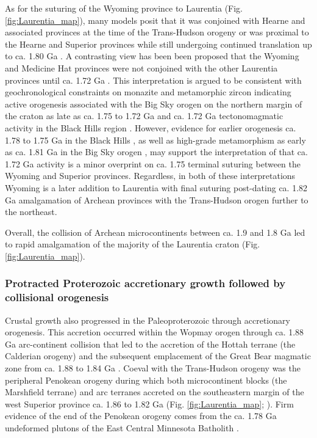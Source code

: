 \documentclass[twocolumn, switch]{article} %
\begin{document}
As for the suturing of the Wyoming province to Laurentia (Fig. \ref{fig:Laurentia_map}), many models posit that it was conjoined with Hearne and associated provinces at the time of the Trans-Hudson orogeny \citep[e.g.][]{St-Onge2009a, Pehrsson2015a} or was proximal to the Hearne and Superior provinces while still undergoing continued translation up to ca. 1.80 Ga \citep{Whitmeyer2007a}. A contrasting view has been been proposed that the Wyoming and Medicine Hat provinces were not conjoined with the other Laurentia provinces until ca. 1.72 Ga \citep{Kilian2016b}. This interpretation is argued to be consistent with geochronological constraints on monazite and metamorphic zircon indicating active orogenesis associated with the Big Sky orogen on the northern margin of the craton as late as ca. 1.75 to 1.72 Ga \citep{Condit2015a} and ca. 1.72 Ga tectonomagmatic activity in the Black Hills region \citep{Redden1990a}. However, evidence for earlier orogenesis ca. 1.78 to 1.75 Ga in the Black Hills \citep{Dahl1999a, Hrncir2017a}, as well as high-grade metamorphism as early as ca. 1.81 Ga in the Big Sky orogen \citep{Condit2015a}, may support the interpretation of \citet{Hrncir2017a} that ca. 1.72 Ga activity is a minor overprint on ca. 1.75 terminal suturing between the Wyoming and Superior provinces. Regardless, in both of these interpretations Wyoming is a later addition to Laurentia with final suturing post-dating ca. 1.82 Ga amalgamation of Archean provinces with the Trans-Hudson orogen further to the northeast. 

Overall, the collision of Archean microcontinents between ca. 1.9 and 1.8 Ga led to rapid amalgamation of the majority of the Laurentia craton (Fig. \ref{fig:Laurentia_map}).

\subsubsection{Protracted Proterozoic accretionary growth followed by collisional orogenesis}

Crustal growth also progressed in the Paleoproterozoic through accretionary orogenesis. This accretion occurred within the Wopmay orogen through ca. 1.88 Ga arc-continent collision that led to the accretion of the Hottah terrane (the Calderian orogeny) and the subsequent emplacement of the Great Bear magmatic zone from ca. 1.88 to 1.84 Ga \citep{Hildebrand2009a}. Coeval with the Trans-Hudson orogeny was the peripheral Penokean orogeny during which both microcontinent blocks (the Marshfield terrane) and arc terranes accreted on the southeastern margin of the west Superior province ca. 1.86 to 1.82 Ga (Fig. \ref{fig:Laurentia_map}; \citealp{Schulz2007a}). Firm evidence of the end of the Penokean orogeny comes from the ca. 1.78 Ga undeformed plutons of the East Central Minnesota Batholith \citep{Holm2005a}.
\end{document}
